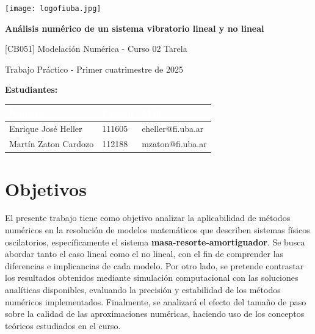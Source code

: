 \documentclass[titlepage,a4paper]{article}
\begin{document}

\begin{titlepage}
    \noindent
    \begin{minipage}{0.45\textwidth}
        \texttt{[image: logofiuba.jpg]}
    \end{minipage}
    \hfill
    \begin{minipage}{0.45\textwidth}
    \end{minipage}

    \centering
    \vfill
    {\Huge \bfseries 
Análisis numérico de un sistema vibratorio lineal y no lineal \par}
    \vspace{1cm}
    {\Large [CB051] Modelación Numérica - Curso 02 Tarela \par}
    \vspace{0.05cm}
    Trabajo Práctico - Primer cuatrimestre de 2025
    \vspace{1cm}

    \noindent\textbf{Estudiantes:}
    
    \vspace{0.5cm}
    
    \centering
    \renewcommand{\arraystretch}{1.4}
    \begin{tabular}{|p{5cm}|p{3cm}|p{6cm}|}
        \rowcolor{black!80}
        \textcolor{white}{\textbf{Nombre}} & 
        \textcolor{white}{\textbf{Padrón}} & 
        \textcolor{white}{\textbf{Mail}} \\
        \hline
        Enrique José Heller & 111605 & eheller@fi.uba.ar \\
        \hline
        Martín Zaton Cardozo & 112188 & mzaton@fi.uba.ar \\
        \hline
    \end{tabular}

    \vfill
\end{titlepage}

\tableofcontents
\newpage

\section{Objetivos}

El presente trabajo tiene como objetivo analizar la aplicabilidad de métodos numéricos en la resolución de modelos matemáticos que describen sistemas físicos oscilatorios, específicamente el sistema \textbf{masa-resorte-amortiguador}. Se busca abordar tanto el caso lineal como el no lineal, con el fin de comprender las diferencias e implicancias de cada modelo. Por otro lado, se pretende contrastar los resultados obtenidos mediante simulación computacional con las soluciones analíticas disponibles, evaluando la precisión y estabilidad de los métodos numéricos implementados. Finalmente, se analizará el efecto del tamaño de paso sobre la calidad de las aproximaciones numéricas, haciendo uso de los conceptos teóricos estudiados en el curso.
\end{document}
